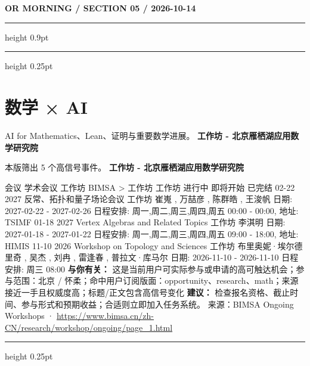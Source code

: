 \documentclass[10.5pt]{ctexart}
\begin{document}
\newpage
{\small\bfseries OR MORNING / SECTION 05 / 2026-10-14}
\vspace{2mm}
\hrule height 0.9pt
\vspace{1.5mm}
\hrule height 0.25pt
\vspace{4mm}
\section*{数学 × AI}
{\color{ormuted} AI for Mathematics、Lean、证明与重要数学进展。}
\vspace{2mm}
{\LARGE\bfseries 工作坊 - 北京雁栖湖应用数学研究院}\par
\vspace{1mm}
{\color{ormuted} 本版筛出 5 个高信号事件。}
\vspace{3mm}
{\Large\bfseries 工作坊 - 北京雁栖湖应用数学研究院}\par
会议 学术会议 工作坊 BIMSA > 工作坊 工作坊 进行中 即将开始 已完结 02-22 2027 反常、拓扑和量子场论会议 工作坊 崔嵬 , 万喆彦 , 陈群皓 , 王浚帆 日期: 2027-02-22 - 2027-02-26 日程安排: 周一,周二,周三,周四,周五 00:00 - 00:00, 地址: TSIMF 01-18 2027 Vertex Algebras and Related Topics 工作坊 李淇明 日期: 2027-01-18 - 2027-01-22 日程安排: 周一,周二,周三,周四,周五 09:00 - 18:00, 地址: HIMIS 11-10 2026 Workshop on Topology and Sciences 工作坊 布里奥妮·埃尔德里奇 , 吴杰 , 刘冉 , 雷逢春 , 普拉文·库马尔 日期: 2026-11-10 - 2026-11-10 日程安排: 周三 08:00
\textbf{与你有关：} 这是当前用户可实际参与或申请的高可触达机会；参与范围：北京 / 怀柔；命中用户订阅版面：opportunity、research、math；来源接近一手且权威度高；标题/正文包含高信号变化
\textbf{建议：} 检查报名资格、截止时间、参与形式和预期收益；合适则立即加入任务系统。
{\footnotesize\color{ormuted} 来源：BIMSA Ongoing Workshops · \url{https://www.bimsa.cn/zh-CN/research/workshop/ongoing/page_1.html}}
\vspace{4mm}
\hrule height 0.25pt
\vspace{3mm}
\end{document}
